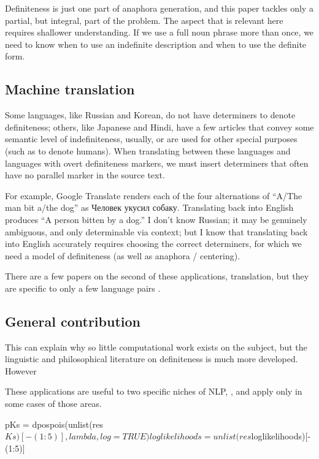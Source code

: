 \documentclass[11pt]{article}
\begin{document}
Definiteness is just one part of anaphora generation, and this paper tackles only a partial, but integral, part of the problem. The aspect that is relevant here requires shallower understanding. If we use a full noun phrase more than once, we need to know when to use an indefinite description and when to use the definite form.



\subsection{Machine translation}

Some languages, like Russian and Korean, do not have determiners to denote definiteness; others, like Japanese and Hindi, have a few articles that convey some semantic level of indefiniteness, usually, or are used for other special purposes (such as to denote humans). %
When translating between these languages and languages with overt definiteness markers, we must insert determiners that often have no parallel marker in the source text.

For example, Google Translate renders each of the four alternations of ``A/The man bit a/the dog'' as \foreignlanguage{russian}{Человек укусил собаку.} Translating back into English produces ``A person bitten by a dog.'' I don't know Russian; it may be genuinely ambiguous, and only determinable via context; but I know that translating back into English accurately requires choosing the correct determiners, for which we need a model of definiteness (as well as anaphora / centering).





\noindent
There are a few papers on the second of these applications, translation, but they are specific to only a few language pairs \citep{ishikawa:1995, siegel:1996}.

\subsection{General contribution}
This can explain why so little computational work exists on the subject, but the linguistic and philosophical literature on definiteness is much more developed.
However


These applications are useful to two specific niches of NLP, , and apply only in some cases of those areas.


pKs = dpospois(unlist(res$Ks)[-(1:5)], lambda, log=TRUE)
loglikelihoods = unlist(res$loglikelihoods)[-(1:5)]
\end{document}
